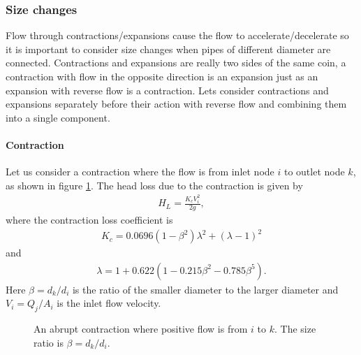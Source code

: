 \subsubsection{Size changes}

Flow through contractions/expansions cause the flow to accelerate/decelerate so it is important to consider size changes when pipes of different diameter are connected. Contractions and expansions are really two sides of the same coin, a contraction with flow in the opposite direction is an expansion just as an expansion with reverse flow is a contraction. Lets consider contractions and expansions separately before their action with reverse flow and combining them into a single component.  

\paragraph{Contraction}

Let us consider a contraction where the flow is from inlet node $i$ to outlet node $k$, as shown in figure \ref{fig:contraction_diagram}. The head loss due to the contraction \cite{rennels22} is given by
\begin{align}
H_L = \frac{K_c V_i^2}{2g},
\end{align}
where the contraction loss coefficient is
\begin{align*}
K_c = 0.0696 \left( 1 - \beta^2 \right) \lambda^2 + \left( \lambda - 1 \right)^2
\end{align*}
and
\begin{align*}
\lambda = 1 + 0.622 \left( 1 - 0.215 \beta^2 - 0.785 \beta^5 \right).
\end{align*}
Here $\beta = d_k / d_i$ is the ratio of the smaller diameter to the larger diameter and $V_i = Q_j / A_i$ is the inlet flow velocity. 

\begin{figure}
\centering
{} 
\caption{An abrupt contraction where positive flow is from $i$ to $k$. The size ratio is $\beta = d_k / d_i$.}
\label{fig:contraction_diagram}
\end{figure}

